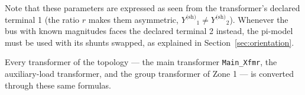 \documentclass[a4paper,11pt]{article}
\newcommand{\code}[1]{\texttt{#1}}  %
\newcommand{\Ysh}{\ensuremath{Y^{\textrm{(sh)}}}}
\begin{document}
Note that these parameters are expressed as seen from the transformer's declared
terminal 1 (the ratio $r$ makes them asymmetric, $\Ysh_1 \neq \Ysh_2$). Whenever the bus
with known magnitudes faces the declared terminal 2 instead, the pi-model must be used
with its shunts swapped, as explained in Section~\ref{sec:orientation}.

Every transformer of the topology --- the main transformer \code{Main\_Xfmr}, the
auxiliary-load transformer, and the group transformer of Zone 1 --- is converted through
these same formulas.






\clearpage
\printbibliography
\end{document}
